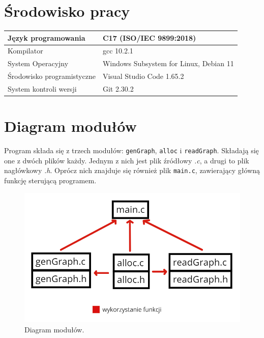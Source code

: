 \documentclass[10pt, a4paper]{report}
\begin{document}
    \section{Środowisko pracy}
    \begin{tabularx}{\textwidth}{ X|X }
        \hline Język programowania & C17 (ISO/IEC 9899:2018) \\
        \hline Kompilator & gcc 10.2.1 \\
        \hline System Operacyjny & Windows Subsystem for Linux, Debian 11 \\
        \hline Środowisko programistyczne & Visual Studio Code 1.65.2 \\
        \hline System kontroli wersji & Git 2.30.2 \\
        \hline
    \end{tabularx}

    \section{Diagram modułów}
    Program składa się z trzech modułów: \texttt{genGraph}, \texttt{alloc} i \texttt{readGraph}. Składają się one z dwóch plików każdy. Jednym z nich jest plik źródłowy \textit{.c}, a drugi to plik nagłówkowy \textit{.h}.
    Oprócz nich znajduje się również plik \texttt{main.c}, zawierający główną funkcję sterującą programem.
    \begin{figure}[h]
        \begin{center}
            \includegraphics[scale=0.5]{modules_diagram.jpg}
            \caption{Diagram modułów.}
        \end{center}        
    \end{figure}
    \newpage
\end{document}
